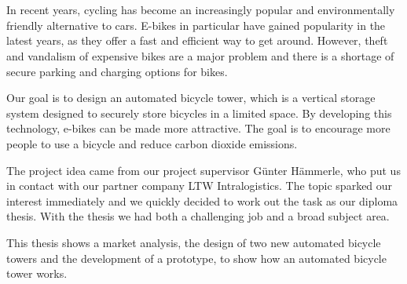 \section*{}
In recent years, cycling has become an increasingly popular and environmentally friendly alternative to cars. E-bikes in particular have gained popularity in the latest years, as they offer a fast and efficient way to get around. However, theft and vandalism of expensive bikes are a major problem and there is a shortage of secure parking and charging options for bikes.

\noindent Our goal is to design an automated bicycle tower, which is a vertical storage system designed to securely store bicycles in a limited space. By developing this technology, e-bikes can be made more attractive. The goal is to encourage more people to use a bicycle and reduce carbon dioxide emissions.

\noindent The project idea came from our project supervisor Günter Hämmerle, who put us in contact with our partner company LTW Intralogistics. The topic sparked our interest immediately and we quickly decided to work out the task as our diploma thesis. With the thesis we had both a challenging job and a broad subject area.

\noindent This thesis shows a market analysis, the design of two new automated bicycle towers and the development of a prototype, to show how an automated bicycle tower works.
